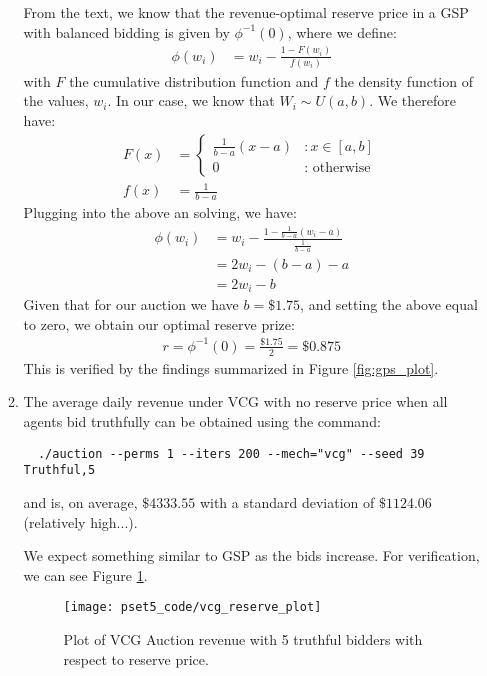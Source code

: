 \documentclass[11pt]{article}
\begin{document}
\begin{enumerate}[resume]
\begin{enumerate}
  From the text, we know that the revenue-optimal reserve price in a GSP with balanced bidding is given by $\phi^{-1}(0)$, where we define:
  \begin{align*}
    \phi(w_i) &= w_i - \frac{1-F(w_i)}{f(w_i)}
  \end{align*}
  with $F$ the cumulative distribution function and $f$ the density function of the values, $w_i$. In our case, we know that $W_i \sim U(a,b)$. We therefore have:
  \begin{align*}
    F(x) &= \left\{
     \begin{array}{lr}
       \frac{1}{b-a}(x - a) & : x \in [a, b] \\
       0 & : \text{ otherwise }
     \end{array}
   \right.\\
   f(x) &= \frac{1}{b-a}  
  \end{align*}
  Plugging into the above an solving, we have:
  \begin{align*}
  \phi(w_i) &= w_i - \frac{1 - \frac{1}{b-a}(w_i - a)}{\frac{1}{b-a}} \\
  &= 2w_i - (b-a) - a \\
  &= 2w_i -b 
  \end{align*}
  Given that for our auction we have $b = \$1.75$, and setting the above equal to zero, we obtain our optimal reserve prize:
  \begin{align*}
  r = \phi^{-1}(0) = \frac{\$1.75}{2} = \$0.875
  \end{align*}
  This is verified by the findings summarized in Figure \ref{fig:gps_plot}.

  \item The average daily revenue under VCG with no reserve price when all agents bid truthfully can be obtained using the command:
  \begin{lstlisting}
  ./auction --perms 1 --iters 200 --mech="vcg" --seed 39  Truthful,5
  \end{lstlisting}
  and is, on average, $\$4333.55$ with a standard deviation of $\$1124.06$ (relatively high...).

  We expect something similar to GSP as the bids increase. For verification, we can see Figure \ref{fig:vcg_reserve}.

  \begin{figure}[!h]
    \centering
    \texttt{[image: pset5\_code/vcg\_reserve\_plot]}
    \caption{Plot of VCG Auction revenue with 5 truthful bidders with respect to reserve price.}
    \label{fig:vcg_reserve}
  \end{figure}


\end{enumerate}
\end{enumerate}
\end{document}

